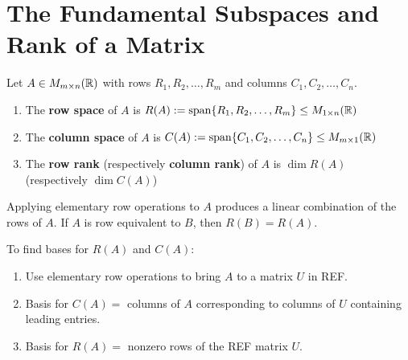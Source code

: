 \newpage
\section{The Fundamental Subspaces and Rank of a Matrix}

\begin{definition}
Let $A \in M_{m \times n}(\mathbb{R})$ with rows $R_1, R_2, \dots, R_m$ and columns $C_1, C_2, \dots, C_n$.
\begin{enumerate}
    \item The \textbf{row space} of $A$ is $R(A) := \operatorname{span}\{R_1, R_2, \dots, R_m\} \leq M_{1 \times n}(\mathbb{R})$
    \item The \textbf{column space} of $A$ is $C(A) := \operatorname{span}\{C_1, C_2, \dots, C_n\} \leq M_{m \times 1}(\mathbb{R})$
    \item The \textbf{row rank} (respectively \textbf{column rank}) of $A$ is $\dim R(A)$ (respectively $\dim C(A)$)
\end{enumerate}
\end{definition}

\begin{remark}
Applying elementary row operations to $A$ produces a linear combination
of the rows of $A$. If $A$ is row equivalent to $B$, then $R(B) = R(A)$.
\end{remark}

To find bases for $R(A)$ and $C(A)$:
\begin{enumerate}
    \item Use elementary row operations to bring $A$ to a matrix $U$ in REF.
    \item Basis for $C(A) = $ columns of $A$ corresponding to columns of $U$ containing leading entries.
    \item Basis for $R(A) = $ nonzero rows of the REF matrix $U$.
\end{enumerate}

